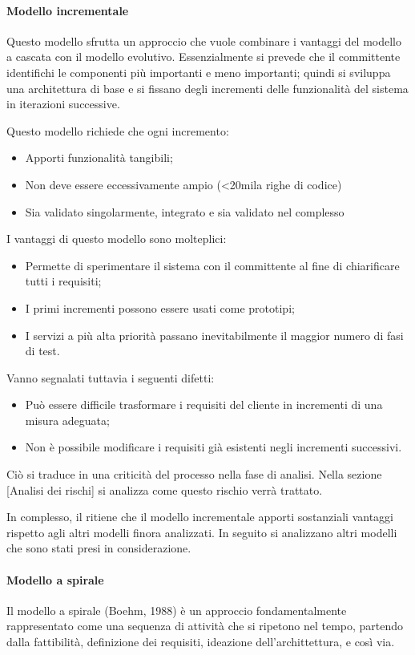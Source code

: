 			\paragraph{Modello incrementale}
			Questo modello sfrutta un approccio che vuole combinare i vantaggi del modello a cascata con il modello evolutivo. Essenzialmente si prevede che il committente identifichi le componenti più importanti e meno importanti; quindi si sviluppa una architettura di base e si fissano degli incrementi delle funzionalità del sistema in iterazioni successive.

Questo modello richiede che ogni incremento:
\begin{itemize}
\item Apporti funzionalità tangibili;
\item Non deve essere eccessivamente ampio (<20mila righe di codice)
\item Sia validato singolarmente, integrato e sia validato nel complesso
\end{itemize}

I vantaggi di questo modello sono molteplici:
\begin{itemize}
\item Permette di sperimentare il sistema con il committente al fine di chiarificare tutti i requisiti;
\item I primi incrementi possono essere usati come prototipi;
\item I servizi a più alta priorità passano inevitabilmente il maggior numero di fasi di test.
\end{itemize}

Vanno segnalati tuttavia i seguenti difetti:
\begin{itemize}
\item Può essere difficile trasformare i requisiti del cliente in incrementi di una misura adeguata;
\item Non è possibile modificare i requisiti già esistenti negli incrementi successivi.
\end{itemize}

Ciò si traduce in una criticità del processo nella fase di analisi. Nella sezione [Analisi dei rischi] si analizza come questo rischio verrà trattato.

In complesso, il  ritiene che il modello incrementale apporti sostanziali vantaggi rispetto agli altri modelli finora analizzati. In seguito si analizzano altri modelli che sono stati presi in considerazione.

			\paragraph{Modello a spirale}
			Il modello a spirale (Boehm, 1988) è un approccio fondamentalmente rappresentato come una sequenza di attività che si ripetono nel tempo, partendo dalla fattibilità, definizione dei requisiti, ideazione dell'archittettura, e così via.
			
